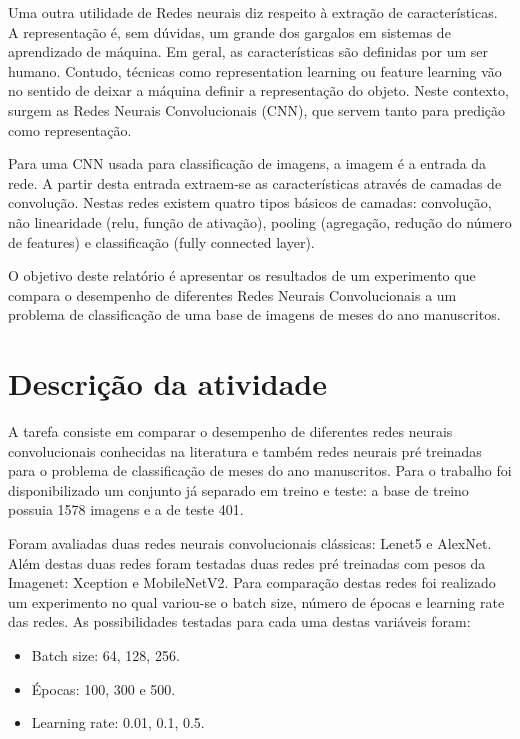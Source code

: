 \documentclass[
	12pt,				%
	openright,			%
	twoside,			%
	a4paper,			%
	english,			%
	brazil,				%
	svgnames
	]{abntex2}\usepackage[]{graphicx}\usepackage[]{color}
\begin{document}
Uma outra utilidade de Redes neurais diz respeito à extração de características. A representação é, sem dúvidas, um grande dos gargalos em sistemas de aprendizado de máquina. Em geral, as características são definidas por um ser humano. Contudo, técnicas como representation learning ou feature learning vão no sentido de deixar a máquina definir a representação do objeto. Neste contexto, surgem as Redes Neurais Convolucionais (CNN), que servem tanto para predição como representação.

Para uma CNN usada para classificação de imagens, a imagem é a entrada da rede. A partir desta entrada extraem-se as características através de camadas de convolução. Nestas redes existem quatro tipos básicos de camadas: convolução, não linearidade (relu, função de ativação), pooling (agregação, redução do número de features) e classificação (fully connected layer).

O objetivo deste relatório é apresentar os resultados de um experimento que compara o desempenho de diferentes Redes Neurais Convolucionais a um problema de classificação de uma base de imagens de meses do ano manuscritos.

\chapter{Descrição da atividade}
\label{cap:descricao}


A tarefa consiste em comparar o desempenho de diferentes redes neurais convolucionais conhecidas na literatura e também redes neurais pré treinadas para o problema de classificação de meses do ano manuscritos. Para o trabalho foi disponibilizado um conjunto já separado em treino e teste: a base de treino possuia 1578 imagens e a de teste 401.

Foram avaliadas duas redes neurais convolucionais clássicas: Lenet5 e AlexNet. Além destas duas redes foram testadas duas redes pré treinadas com pesos da Imagenet: Xception e MobileNetV2. Para comparação destas redes foi realizado um experimento no qual variou-se o batch size, número de épocas e learning rate das redes. As possibilidades testadas para cada uma destas variáveis foram:

\begin{itemize}
  \itemsep 0.5ex
  \item Batch size: 64, 128, 256.
  \item Épocas: 100, 300 e 500.
  \item Learning rate: 0.01, 0.1, 0.5.
\end{itemize}
\end{document}
